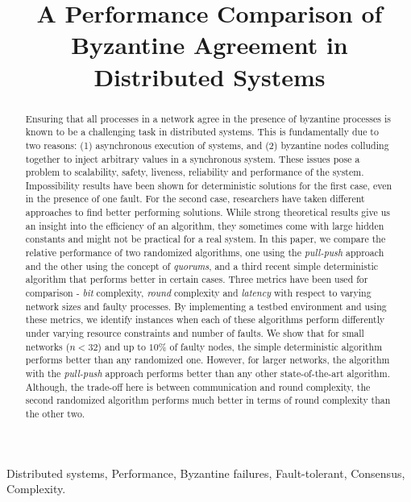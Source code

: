 \title{A Performance Comparison of Byzantine Agreement in Distributed Systems}


%

\maketitle

\begin{abstract}

Ensuring that all processes in a network agree in the
presence of byzantine processes is known to be a challenging task in
distributed systems. This is fundamentally due to two reasons: (1)
asynchronous execution of systems, and (2) byzantine
nodes colluding together to inject arbitrary values in a synchronous
system. These issues pose a problem to scalability, safety, liveness,
reliability and performance of the system. Impossibility results have
been shown for deterministic solutions for the first case, even in the
presence of one fault. For the second case, researchers have taken
different approaches to find better performing solutions. While strong
theoretical results give us an insight into the efficiency of an
algorithm, they sometimes come with large hidden constants and might not
be practical for a real system. In this paper, we compare the relative
performance of two randomized algorithms, one using the {\em pull-push} approach
and the other using the concept of {\em quorums}, and a third recent simple
deterministic algorithm that performs
better in certain cases.
Three metrics have been used for comparison - {\em bit}
complexity, {\em round} complexity and {\em latency} with respect to varying network sizes and
faulty processes. By implementing a testbed environment and using these metrics, we identify instances when each of these
algorithms perform differently under varying resource constraints and
number of faults. We show that for small networks ($n<32$) and up to $10\%$ of faulty nodes, the simple deterministic algorithm performs better than any randomized one. However, for larger networks, the algorithm with the {\em pull-push} approach performs better than any other state-of-the-art algorithm. Although, the trade-off here is between communication and round complexity, the second randomized algorithm performs much better in terms of round complexity than the other two. 

\end{abstract}

 Distributed systems, Performance, Byzantine failures, Fault-tolerant, Consensus, Complexity.

